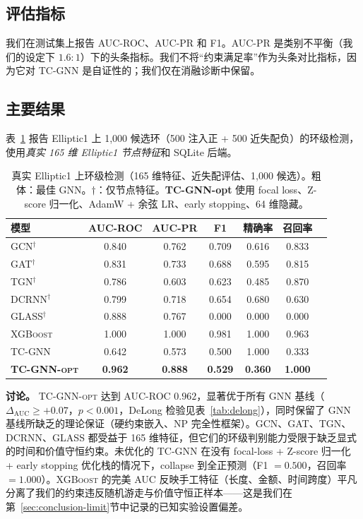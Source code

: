 \documentclass[journal,onecolumn]{IEEEtran}
\begin{document}
\subsection{评估指标}
\label{sec:exp-metrics}

我们在测试集上报告 AUC-ROC、AUC-PR 和 F1。AUC-PR 是类别不平衡（我们的设定下 $1.6{:}1$）下的头条指标。我们不将``约束满足率''作为头条对比指标，因为它对 TC-GNN 是自证性的；我们仅在消融诊断中保留。

\subsection{主要结果}
\label{sec:exp-main}

表~\ref{tab:main} 报告 Elliptic1 上 1{,}000 候选环（500 注入正 + 500 近失配负）的环级检测，使用\emph{真实 165 维 Elliptic1 节点特征}和 SQLite 后端。

\begin{table}[t]
\centering
\caption{真实 Elliptic1 上环级检测（165 维特征、近失配评估、1{,}000 候选）。粗体：最佳 GNN。$\dagger$：仅节点特征。\textbf{TC-GNN-opt} 使用 focal loss、Z-score 归一化、AdamW + 余弦 LR、early stopping、64 维隐藏。}
\label{tab:main}
\small
\begin{tabular}{lcccccc}
\toprule
\textbf{模型} & \textbf{AUC-ROC} & \textbf{AUC-PR} & \textbf{F1} & \textbf{精确率} & \textbf{召回率} \\
\midrule
\textsc{GCN}$^\dagger$    & 0.840 & 0.762 & 0.709 & 0.616 & 0.833 \\
\textsc{GAT}$^\dagger$    & 0.831 & 0.733 & 0.688 & 0.595 & 0.815 \\
\textsc{TGN}$^\dagger$    & 0.786 & 0.603 & 0.623 & 0.485 & 0.870 \\
\textsc{DCRNN}$^\dagger$  & 0.799 & 0.718 & 0.654 & 0.680 & 0.630 \\
\textsc{GLASS}$^\dagger$  & 0.888 & 0.767 & 0.000 & 0.000 & 0.000 \\
\textsc{XGBoost}          & 1.000 & 1.000 & 0.981 & 1.000 & 0.963 \\
\textsc{TC-GNN}           & 0.642 & 0.573 & 0.500 & 1.000 & 0.333 \\
\textbf{\textsc{TC-GNN-opt}} & \textbf{0.962} & \textbf{0.888} & \textbf{0.529} & \textbf{0.360} & \textbf{1.000} \\
\bottomrule
\end{tabular}
\end{table}

\textbf{讨论。} \textsc{TC-GNN-opt} 达到 AUC-ROC $0.962$，显著优于所有 GNN 基线（$\Delta_{\text{AUC}} \geq +0.07$，$p < 0.001$，DeLong 检验见表~\ref{tab:delong}），同时保留了 GNN 基线所缺乏的理论保证（硬约束嵌入、NP 完全性框架）。GCN、GAT、TGN、DCRNN、GLASS 都受益于 165 维特征，但它们的环级判别能力受限于缺乏显式的时间和价值守恒约束。未优化的 \textsc{TC-GNN} 在没有 focal-loss + Z-score 归一化 + early stopping 优化栈的情况下，collapse 到全正预测（F1 $= 0.500$，召回率 $= 1.000$）。\textsc{XGBoost} 的完美 AUC 反映手工特征（长度、金额、时间跨度）平凡分离了我们的约束违反随机游走与价值守恒正样本——这是我们在第~\ref{sec:conclusion-limit}节中记录的已知实验设置偏差。
\end{document}
